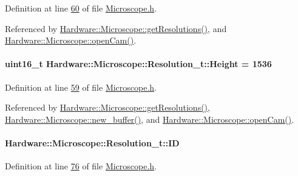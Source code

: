 Definition at line \hyperlink{_microscope_8h_source_l00060}{60} of file \hyperlink{_microscope_8h_source}{Microscope.\+h}.



Referenced by \hyperlink{_microscope_8cpp_source_l00123}{Hardware\+::\+Microscope\+::get\+Resolutions()}, and \hyperlink{_microscope_8cpp_source_l00167}{Hardware\+::\+Microscope\+::open\+Cam()}.

\hypertarget{struct_hardware_1_1_microscope_1_1_resolution__t_a0f56bb68dbaf77d47159e46d5384ee60}{}
\paragraph[{Height}]{\setlength{\rightskip}{0pt plus 5cm}uint16\+\_\+t Hardware\+::\+Microscope\+::\+Resolution\+\_\+t\+::\+Height = 1536}\label{struct_hardware_1_1_microscope_1_1_resolution__t_a0f56bb68dbaf77d47159e46d5384ee60}


Definition at line \hyperlink{_microscope_8h_source_l00059}{59} of file \hyperlink{_microscope_8h_source}{Microscope.\+h}.



Referenced by \hyperlink{_microscope_8cpp_source_l00123}{Hardware\+::\+Microscope\+::get\+Resolutions()}, \hyperlink{_microscope_8cpp_source_l00413}{Hardware\+::\+Microscope\+::new\+\_\+buffer()}, and \hyperlink{_microscope_8cpp_source_l00167}{Hardware\+::\+Microscope\+::open\+Cam()}.

\hypertarget{struct_hardware_1_1_microscope_1_1_resolution__t_a953e7a65311a4861b6db47b4faf74d4e}{}
\paragraph[{I\+D}]{ Hardware\+::\+Microscope\+::\+Resolution\+\_\+t\+::\+I\+D}\label{struct_hardware_1_1_microscope_1_1_resolution__t_a953e7a65311a4861b6db47b4faf74d4e}


Definition at line \hyperlink{_microscope_8h_source_l00076}{76} of file \hyperlink{_microscope_8h_source}{Microscope.\+h}.



